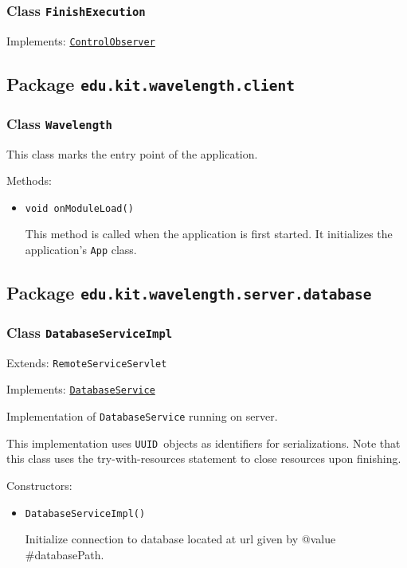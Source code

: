 \subsubsection{Class \texttt{FinishExecution}}
\label{type:edu.kit.wavelength.client.view.update.FinishExecution}
Implements: \texttt{\hyperref[type:edu.kit.wavelength.client.view.execution.ControlObserver]{ControlObserver}}



\subsection{Package \lstinline{edu.kit.wavelength.client}}
\label{pkg:edu.kit.wavelength.client}


\subsubsection{Class \texttt{Wavelength}}
\label{type:edu.kit.wavelength.client.Wavelength}
This class marks the entry point of the application.

Methods:
\begin{itemize}
\item \texttt{void onModuleLoad()}

This method is called when the application is first started. It initializes
 the application's \texttt{App} class.

\end{itemize}

\subsection{Package \lstinline{edu.kit.wavelength.server.database}}
\label{pkg:edu.kit.wavelength.server.database}


\subsubsection{Class \texttt{DatabaseServiceImpl}}
\label{type:edu.kit.wavelength.server.database.DatabaseServiceImpl}
Extends: \texttt{RemoteServiceServlet}

Implements: \texttt{\hyperref[type:edu.kit.wavelength.client.database.DatabaseService]{DatabaseService}}

Implementation of \texttt{DatabaseService} running on server.
 
 This implementation uses \texttt{UUID} objects as identifiers for
 serializations. Note that this class uses the try-with-resources statement to
 close resources upon finishing.

Constructors:
\begin{itemize}
\item \texttt{DatabaseServiceImpl()}

Initialize connection to database located at url given by
 {@value #databasePath}.

\end{itemize}

